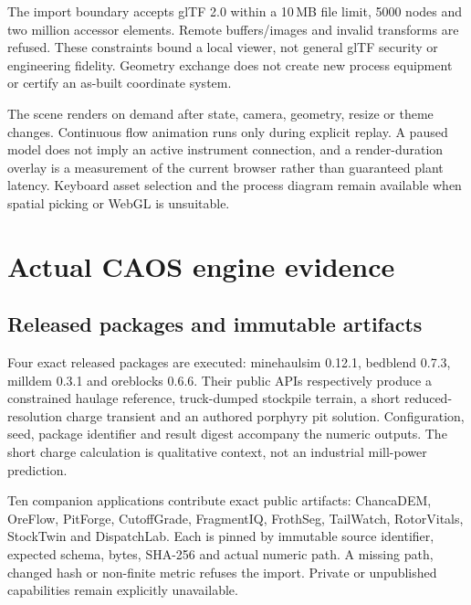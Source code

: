 \documentclass[11pt,a4paper]{article}
\begin{document}
The import boundary accepts glTF 2.0 within a 10\,MB file limit, 5000 nodes and two million accessor elements. Remote buffers/images and invalid transforms are refused. These constraints bound a local viewer, not general glTF security or engineering fidelity. Geometry exchange does not create new process equipment or certify an as-built coordinate system.

The scene renders on demand after state, camera, geometry, resize or theme changes. Continuous flow animation runs only during explicit replay. A paused model does not imply an active instrument connection, and a render-duration overlay is a measurement of the current browser rather than guaranteed plant latency. Keyboard asset selection and the process diagram remain available when spatial picking or WebGL is unsuitable.

\section{Actual CAOS engine evidence}
\subsection{Released packages and immutable artifacts}
Four exact released packages are executed: minehaulsim 0.12.1, bedblend 0.7.3, milldem 0.3.1 and oreblocks 0.6.6. Their public APIs respectively produce a constrained haulage reference, truck-dumped stockpile terrain, a short reduced-resolution charge transient and an authored porphyry pit solution. Configuration, seed, package identifier and result digest accompany the numeric outputs. The short charge calculation is qualitative context, not an industrial mill-power prediction.

Ten companion applications contribute exact public artifacts: ChancaDEM, OreFlow, PitForge, CutoffGrade, FragmentIQ, FrothSeg, TailWatch, RotorVitals, StockTwin and DispatchLab. Each is pinned by immutable source identifier, expected schema, bytes, SHA-256 and actual numeric path. A missing path, changed hash or non-finite metric refuses the import. Private or unpublished capabilities remain explicitly unavailable.

\begin{table}[htbp]\centering\small
\caption{Executed or verified external evidence. Release pins and declared software licenses identify the source; full immutable identifiers, hashes and extracted numeric paths are in the public source manifest. Original cases remain independent of the connected plant's synthetic observations.}

\end{table}
\end{document}
